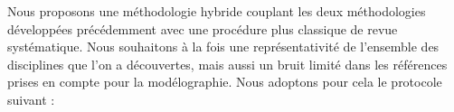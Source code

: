 Nous proposons une méthodologie hybride couplant les deux méthodologies développées précédemment avec une procédure plus classique de revue systématique. Nous souhaitons à la fois une représentativité de l'ensemble des disciplines que l'on a découvertes, mais aussi un bruit limité dans les références prises en compte pour la modélographie. Nous adoptons pour cela le protocole suivant :

%
%  
%
% 
%


